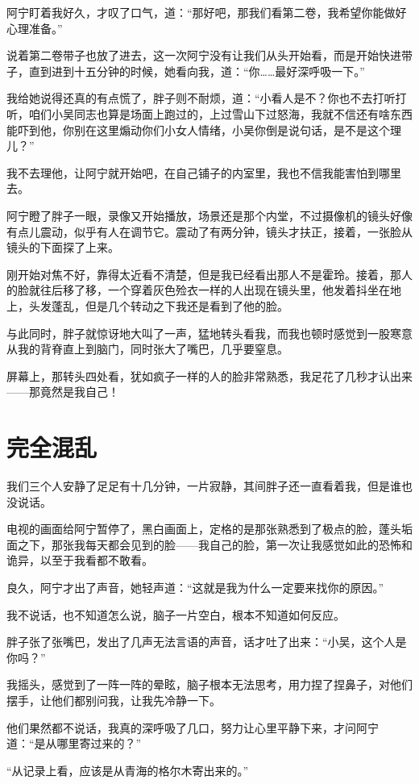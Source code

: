 阿宁盯着我好久，才叹了口气，道：“那好吧，那我们看第二卷，我希望你能做好心理准备。”

说着第二卷带子也放了进去，这一次阿宁没有让我们从头开始看，而是开始快进带子，直到进到十五分钟的时候，她看向我，道：“你……最好深呼吸一下。”

我给她说得还真的有点慌了，胖子则不耐烦，道：“小看人是不？你也不去打听打听，咱们小吴同志也算是场面上跑过的，上过雪山下过怒海，我就不信还有啥东西能吓到他，你别在这里煽动你们小女人情绪，小吴你倒是说句话，是不是这个理儿？”

我不去理他，让阿宁就开始吧，在自己铺子的内室里，我也不信我能害怕到哪里去。

阿宁瞪了胖子一眼，录像又开始播放，场景还是那个内堂，不过摄像机的镜头好像有点儿震动，似乎有人在调节它。震动了有两分钟，镜头才扶正，接着，一张脸从镜头的下面探了上来。

刚开始对焦不好，靠得太近看不清楚，但是我已经看出那人不是霍玲。接着，那人的脸就往后移了移，一个穿着灰色殓衣一样的人出现在镜头里，他发着抖坐在地上，头发蓬乱，但是几个转动之下我还是看到了他的脸。

与此同时，胖子就惊讶地大叫了一声，猛地转头看我，而我也顿时感觉到一股寒意从我的背脊直上到脑门，同时张大了嘴巴，几乎要窒息。

屏幕上，那转头四处看，犹如疯子一样的人的脸非常熟悉，我足花了几秒才认出来——那竟然是我自己！

\chapter{完全混乱}

我们三个人安静了足足有十几分钟，一片寂静，其间胖子还一直看着我，但是谁也没说话。

电视的画面给阿宁暂停了，黑白画面上，定格的是那张熟悉到了极点的脸，蓬头垢面之下，那张我每天都会见到的脸——我自己的脸，第一次让我感觉如此的恐怖和诡异，以至于我看都不敢看。

良久，阿宁才出了声音，她轻声道：“这就是我为什么一定要来找你的原因。”

我不说话，也不知道怎么说，脑子一片空白，根本不知道如何反应。

胖子张了张嘴巴，发出了几声无法言语的声音，话才吐了出来：“小吴，这个人是你吗？”

我摇头，感觉到了一阵一阵的晕眩，脑子根本无法思考，用力捏了捏鼻子，对他们摆手，让他们都别问我，让我先冷静一下。

他们果然都不说话，我真的深呼吸了几口，努力让心里平静下来，才问阿宁道：“是从哪里寄过来的？”

“从记录上看，应该是从青海的格尔木寄出来的。”

